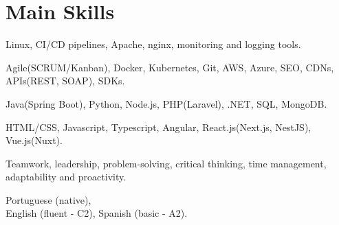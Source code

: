 \section{Main Skills}
{Linux, CI/CD pipelines, Apache, nginx, monitoring and logging tools.}

{Agile(SCRUM/Kanban), Docker, Kubernetes, Git, AWS, Azure, SEO, CDNs, APIs(REST, SOAP), SDKs.}

{Java(Spring Boot), Python, Node.js, PHP(Laravel), .NET, SQL, MongoDB.}

{HTML/CSS, Javascript, Typescript, Angular, React.js(Next.js, NestJS), Vue.js(Nuxt).}

{Teamwork, leadership, problem-solving, critical thinking, time management, adaptability and proactivity.}

{Portuguese (native), \\ English (fluent - C2), Spanish (basic - A2).}
